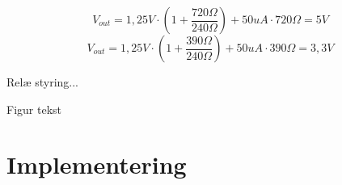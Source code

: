 \begin{equation} 
{ V }_{ out }=1,25V\cdot \left( 1+\frac { 720\Omega  }{ 240\Omega  }  \right) +50uA\cdot 720\Omega =5V
\label{eq:Vout5V}
\end{equation}
\begin{equation} 
{ V }_{ out }=1,25V\cdot \left( 1+\frac { 390\Omega  }{ 240\Omega  }  \right) +50uA\cdot 390\Omega =3,3V
\label{eq:Vout3.3V}
\end{equation}

Relæ styring...




Figur tekst 

\section{Implementering}




